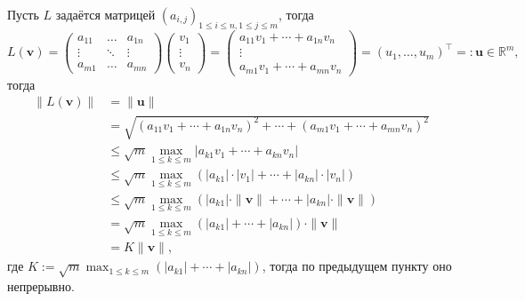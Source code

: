 \documentclass[a4paper]{article}
\begin{document}
Пусть $L$ задаётся матрицей $\left(a_{i, j}\right)_{1 \leq i \leq n, 1 \leq j \leq m}$, тогда
$$
L(\mathbf{v})=\left(\begin{array}{ccc}
a_{11} & \ldots & a_{1 n} \\
\vdots & \ddots & \vdots \\
a_{m 1} & \ldots & a_{m n}
\end{array}\right)\left(\begin{array}{c}
v_1 \\
\vdots \\
v_n
\end{array}\right)=\left(\begin{array}{c}
a_{11} v_1+\cdots+a_{1 n} v_n \\
\vdots \\
a_{m 1} v_1+\cdots+a_{m n} v_n
\end{array}\right)=\left(u_1, \ldots, u_m\right)^{\top}=: \mathbf{u} \in \mathbb{R}^m,
$$
тогда
$$
\begin{aligned}
\|L(\mathbf{v})\| & =\|\mathbf{u}\| \\
& =\sqrt{\left(a_{11} v_1+\cdots+a_{1 n} v_n\right)^2+\cdots+\left(a_{m 1} v_1+\cdots+a_{m n} v_n\right)^2} \\
& \leq \sqrt{m} \max _{1 \leq k \leq m}\left|a_{k 1} v_1+\cdots+a_{k n} v_n\right| \\
& \leq \sqrt{m} \max _{1 \leq k \leq m}\left(\left|a_{k 1}\right| \cdot\left|v_1\right|+\cdots+\left|a_{k n}\right| \cdot\left|v_n\right|\right) \\
& \leq \sqrt{m} \max _{1 \leq k \leq m}\left(\left|a_{k 1}\right| \cdot\|\mathbf{v}\|+\cdots+\left|a_{k n}\right| \cdot\|\mathbf{v}\|\right) \\
& =\sqrt{m} \max _{1 \leq k \leq m}\left(\left|a_{k 1}\right|+\cdots+\left|a_{k n}\right|\right) \cdot\|\mathbf{v}\| \\
& =K\|\mathbf{v}\|,
\end{aligned}
$$
где $K:=\sqrt{m} \max _{1 \leq k \leq m}\left(\left|a_{k 1}\right|+\cdots+\left|a_{k n}\right|\right)$, тогда по предыдущем пункту оно непрерывно.
\end{document}
